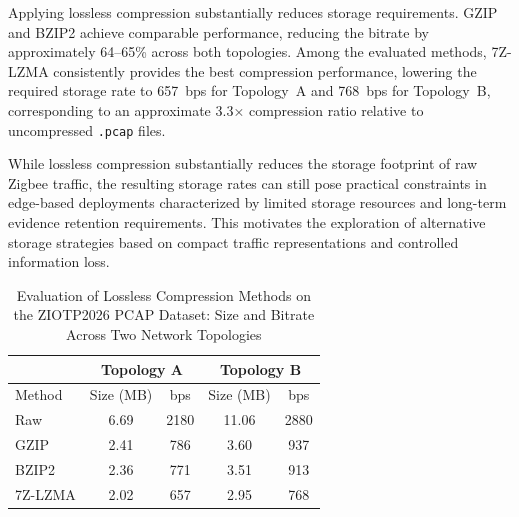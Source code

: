 Applying lossless compression substantially reduces storage requirements. GZIP and BZIP2 achieve comparable performance, reducing the bitrate by approximately 64--65\% across both topologies. Among the evaluated methods, 7Z-LZMA consistently provides the best compression performance, lowering the required storage rate to 657~bps for Topology~A and 768~bps for Topology~B, corresponding to an approximate 3.3× compression ratio relative to uncompressed \texttt{.pcap} files.

While lossless compression substantially reduces the storage footprint of raw Zigbee traffic, the resulting storage rates can still pose practical constraints in edge-based deployments characterized by limited storage resources and long-term evidence retention requirements. This motivates the exploration of alternative storage strategies based on compact traffic representations and controlled information loss.




\begin{table}[h]
    \centering
\caption{Evaluation of Lossless Compression Methods on the ZIOTP2026 PCAP Dataset: Size and Bitrate Across Two Network Topologies}
    \label{tab:lossless_compression}
    \begin{tabular}{lcccc}
    & \multicolumn{2}{c}{Topology A} & \multicolumn{2}{c}{Topology B} \\ \hline
Method & \multicolumn{1}{c}{Size (MB)} & \multicolumn{1}{c}{bps} & \multicolumn{1}{c}{Size (MB)} & \multicolumn{1}{c}{bps} \\
        \midrule
Raw & 6.69 & 2180 & 11.06 & 2880 \\
GZIP & 2.41 & 786 & 3.60 & 937 \\
BZIP2 & 2.36 & 771 & 3.51 & 913 \\
7Z-LZMA & 2.02 & 657 & 2.95 & 768
    \end{tabular}
\end{table}


